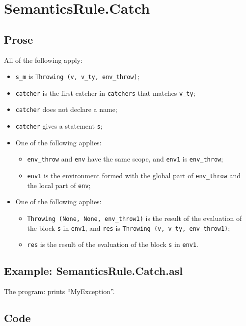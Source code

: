 \documentclass{book}
\begin{document}
\section{SemanticsRule.Catch \label{sec:SemanticsRule.Catch}}

    \subsection{Prose}
    All of the following apply:
    \begin{itemize}
    \item \texttt{s\_m} is \texttt{Throwing (v, v\_ty, env\_throw)};
    \item \texttt{catcher} is the first catcher in \texttt{catchers} that matches \texttt{v\_ty};
    \item \texttt{catcher} does not declare a name;
    \item \texttt{catcher} gives a statement \texttt{s};
    \item One of the following applies:
      \begin{itemize}
      \item \texttt{env\_throw} and \texttt{env} have the same scope, and \texttt{env1} is \texttt{env\_throw};
      \item \texttt{env1} is the environment formed with the global part of \texttt{env\_throw}
        and the local part of \texttt{env};
      \end{itemize}
    \item One of the following applies:
      \begin{itemize}
      \item \texttt{Throwing (None, None, env\_throw1)} is the result of the evaluation of
        the block \texttt{s} in \texttt{env1}, and \texttt{res} is \texttt{Throwing (v, v\_ty, env\_throw1)};
      \item \texttt{res} is the result of the evaluation of the block \texttt{s} in \texttt{env1}.
      \end{itemize}
    \end{itemize}

    \subsection{Example: SemanticsRule.Catch.asl}
    The program:
    prints ``MyException''.

  \subsection{Code}
\end{document}
